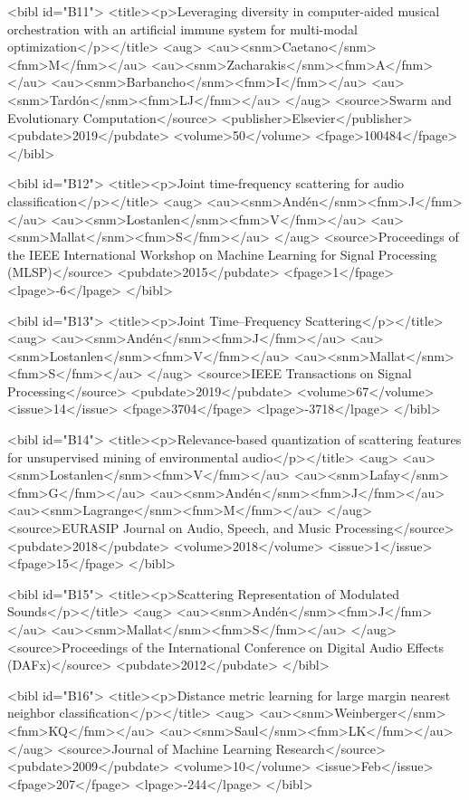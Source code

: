 \documentclass{bmcart}
\begin{document}
\begin{backmatter}
{<bibl id="B11">
  <title><p>Leveraging diversity in computer-aided musical orchestration with
  an artificial immune system for multi-modal optimization</p></title>
  <aug>
    <au><snm>Caetano</snm><fnm>M</fnm></au>
    <au><snm>Zacharakis</snm><fnm>A</fnm></au>
    <au><snm>Barbancho</snm><fnm>I</fnm></au>
    <au><snm>Tard{\'o}n</snm><fnm>LJ</fnm></au>
  </aug>
  <source>Swarm and Evolutionary Computation</source>
  <publisher>Elsevier</publisher>
  <pubdate>2019</pubdate>
  <volume>50</volume>
  <fpage>100484</fpage>
</bibl>

<bibl id="B12">
  <title><p>Joint time-frequency scattering for audio
  classification</p></title>
  <aug>
    <au><snm>And{\'e}n</snm><fnm>J</fnm></au>
    <au><snm>Lostanlen</snm><fnm>V</fnm></au>
    <au><snm>Mallat</snm><fnm>S</fnm></au>
  </aug>
  <source>Proceedings of the IEEE International Workshop on Machine Learning
  for Signal Processing (MLSP)</source>
  <pubdate>2015</pubdate>
  <fpage>1</fpage>
  <lpage>-6</lpage>
</bibl>

<bibl id="B13">
  <title><p>Joint Time--Frequency Scattering</p></title>
  <aug>
    <au><snm>And\'{e}n</snm><fnm>J</fnm></au>
    <au><snm>Lostanlen</snm><fnm>V</fnm></au>
    <au><snm>Mallat</snm><fnm>S</fnm></au>
  </aug>
  <source>IEEE Transactions on Signal Processing</source>
  <pubdate>2019</pubdate>
  <volume>67</volume>
  <issue>14</issue>
  <fpage>3704</fpage>
  <lpage>-3718</lpage>
</bibl>

<bibl id="B14">
  <title><p>Relevance-based quantization of scattering features for
  unsupervised mining of environmental audio</p></title>
  <aug>
    <au><snm>Lostanlen</snm><fnm>V</fnm></au>
    <au><snm>Lafay</snm><fnm>G</fnm></au>
    <au><snm>And{\'e}n</snm><fnm>J</fnm></au>
    <au><snm>Lagrange</snm><fnm>M</fnm></au>
  </aug>
  <source>EURASIP Journal on Audio, Speech, and Music Processing</source>
  <pubdate>2018</pubdate>
  <volume>2018</volume>
  <issue>1</issue>
  <fpage>15</fpage>
</bibl>

<bibl id="B15">
  <title><p>Scattering Representation of Modulated Sounds</p></title>
  <aug>
    <au><snm>And\'{e}n</snm><fnm>J</fnm></au>
    <au><snm>Mallat</snm><fnm>S</fnm></au>
  </aug>
  <source>Proceedings of the International Conference on Digital Audio Effects
  (DAFx)</source>
  <pubdate>2012</pubdate>
</bibl>

<bibl id="B16">
  <title><p>Distance metric learning for large margin nearest neighbor
  classification</p></title>
  <aug>
    <au><snm>Weinberger</snm><fnm>KQ</fnm></au>
    <au><snm>Saul</snm><fnm>LK</fnm></au>
  </aug>
  <source>Journal of Machine Learning Research</source>
  <pubdate>2009</pubdate>
  <volume>10</volume>
  <issue>Feb</issue>
  <fpage>207</fpage>
  <lpage>-244</lpage>
</bibl>

}
\end{backmatter}
\end{document}
